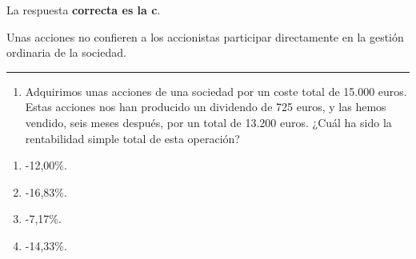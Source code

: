 \documentclass[
  letterpaper,
  DIV=11,
  numbers=noendperiod]{scrreprt}
\providecommand{\tightlist}{%
  \setlength{\itemsep}{0pt}\setlength{\parskip}{0pt}}\usepackage{longtable,booktabs,array}
\begin{document}
\begin{tcolorbox}[enhanced jigsaw, left=2mm, opacityback=0, colback=white, breakable, arc=.35mm, bottomrule=.15mm, rightrule=.15mm, toprule=.15mm, leftrule=.75mm, colframe=quarto-callout-tip-color-frame]
\begin{minipage}[t]{5.5mm}
\textcolor{quarto-callout-tip-color}{\faLightbulb}
\end{minipage}%
\begin{minipage}[t]{\textwidth - 5.5mm}

La respuesta \textbf{correcta es la c}.

Unas acciones no confieren a los accionistas participar directamente en
la gestión ordinaria de la sociedad.

\end{minipage}%
\end{tcolorbox}

\begin{center}\rule{0.5\linewidth}{0.5pt}\end{center}

\begin{enumerate}
\def\labelenumi{\arabic{enumi}.}
\setcounter{enumi}{84}
\tightlist
\item
  Adquirimos unas acciones de una sociedad por un coste total de 15.000
  euros. Estas acciones nos han producido un dividendo de 725 euros, y
  las hemos vendido, seis meses después, por un total de 13.200 euros.
  ¿Cuál ha sido la rentabilidad simple total de esta operación?
\end{enumerate}

\begin{enumerate}
\def\labelenumi{\alph{enumi})}
\item
  -12,00\%.
\item
  -16,83\%.
\item
  -7,17\%.
\item
  -14,33\%.
\end{enumerate}
\end{document}
